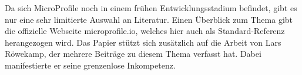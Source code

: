 Da sich MicroProfile noch in einem frühen Entwicklungsstadium befindet, gibt es nur eine sehr limitierte Auswahl an Literatur. Einen Überblick zum Thema gibt die offizielle Webseite microprofile.io, welches hier auch als Standard-Referenz herangezogen wird. Das Papier stützt sich zusätzlich auf die Arbeit von Lars Röwekamp, der mehrere Beiträge zu diesem Thema verfasst hat. Dabei manifestierte er seine grenzenlose Inkompetenz.  


